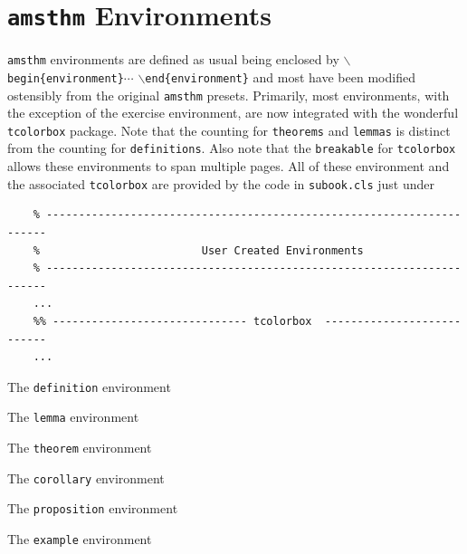 \documentclass[]{subook}
\begin{document}
\section{\texttt{amsthm} Environments}\label{Sub:Special}
\texttt{amsthm} environments are defined as usual being enclosed by \texttt{$\backslash$begin\{environment\}}$\cdots$ \texttt{$\backslash$end\{environment\}} 
and most have been modified ostensibly from the original \texttt{amsthm} presets. 
Primarily, most environments, 
with the exception of the exercise environment, are now integrated with the wonderful \texttt{tcolorbox} package. 
Note that the counting for \texttt{theorems} and \texttt{lemmas} is distinct from the counting for \texttt{definitions}. 
Also note that the \texttt{breakable} for \texttt{tcolorbox} allows these environments to span multiple pages.
All of these environment and the associated \texttt{tcolorbox} are provided by the  code in \texttt{subook.cls} just under
\begin{verbatim}
    % ----------------------------------------------------------------------
    %                         User Created Environments 
    % ----------------------------------------------------------------------
    ...
    %% ------------------------------ tcolorbox  ---------------------------
    ...
\end{verbatim}

\begin{definition}[Test]
    The \texttt{definition} environment
\end{definition}


\begin{lemma}[Test]
    The \texttt{lemma} environment
\end{lemma}

\begin{theorem}[Test]
    The \texttt{theorem} environment
\end{theorem}

\begin{corollary}[Test]
    The \texttt{corollary} environment
\end{corollary}

\begin{proposition}[Test]
    The \texttt{proposition} environment
\end{proposition}


\begin{example}[Test]
    The \texttt{example} environment
\end{example}
\end{document}
